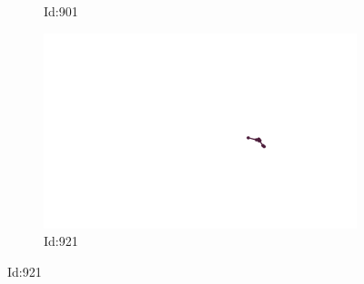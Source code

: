 \documentclass[12pt,twoside]{report}
\begin{document}
\begin{figure}
\begin{subfigure}[b]{0.20\textwidth}
\caption{Id:901}
\end{subfigure}
\begin{subfigure}[b]{0.20\textwidth}
\centering
\includegraphics[width=\textwidth]{../../trajectories/921.png}
\caption{Id:921}
\end{subfigure}
\end{figure}
\end{document}
